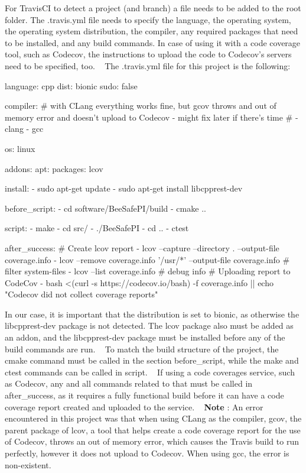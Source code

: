 For Travis\+CI to detect a project (and branch) a file needs to be added to the root folder. The {\ttfamily .travis.\+yml} file needs to specify the language, the operating system, the operating system distribution, the compiler, any required packages that need to be installed, and any build commands. In case of using it with a code coverage tool, such as Codecov, the instructions to upload the code to Codecov’s servers need to be specified, too. ~\newline
 The {\ttfamily .travis.\+yml} file for this project is the following\+: 
\begin{DoxyCode}
language: cpp
dist: bionic
sudo: false

compiler:
# with CLang everything works fine, but gcov throws and out of memory error and doesn't upload to Codecov -
       might fix later if there's time
#  - clang
  - gcc

os: linux

addons:
  apt:
    packages: lcov

install:
  - sudo apt-get update
  - sudo apt-get install libcpprest-dev

before\_script:
  - cd software/BeeSafePI/build
  - cmake ..

script:
  - make
  - cd src/
  - ./BeeSafePI
  - cd ..
  - ctest

after\_success:
# Create lcov report
- lcov --capture --directory . --output-file coverage.info
- lcov --remove coverage.info '/usr/*' --output-file coverage.info # filter system-files
- lcov --list coverage.info # debug info
# Uploading report to CodeCov
- bash <(curl -s https://codecov.io/bash) -f coverage.info || echo "Codecov did not collect coverage
       reports"
\end{DoxyCode}
 In our case, it is important that the distribution is set to {\ttfamily bionic}, as otherwise the {\ttfamily libcpprest-\/dev} package is not detected. The {\ttfamily lcov} package also must be added as an addon, and the {\ttfamily libcpprest-\/dev} package must be installed before any of the build commands are run. ~\newline
 To match the build structure of the project, the cmake command must be called in the section {\ttfamily before\+\_\+script}, while the make and ctest commands can be called in {\ttfamily script}. ~\newline
 If using a code coverages service, such as Codecov, any and all commands related to that must be called in {\ttfamily after\+\_\+success}, as it requires a fully functional build before it can have a code coverage report created and uploaded to the service. ~\newline
 {\bfseries Note} \+: An error encountered in this project was that when using C\+Lang as the compiler, {\ttfamily gcov}, the parent package of {\ttfamily lcov}, a tool that helps create a code coverage report for the use of Codecov, throws an out of memory error, which causes the Travis build to run perfectly, however it does not upload to Codecov. When using gcc, the error is non-\/existent.


